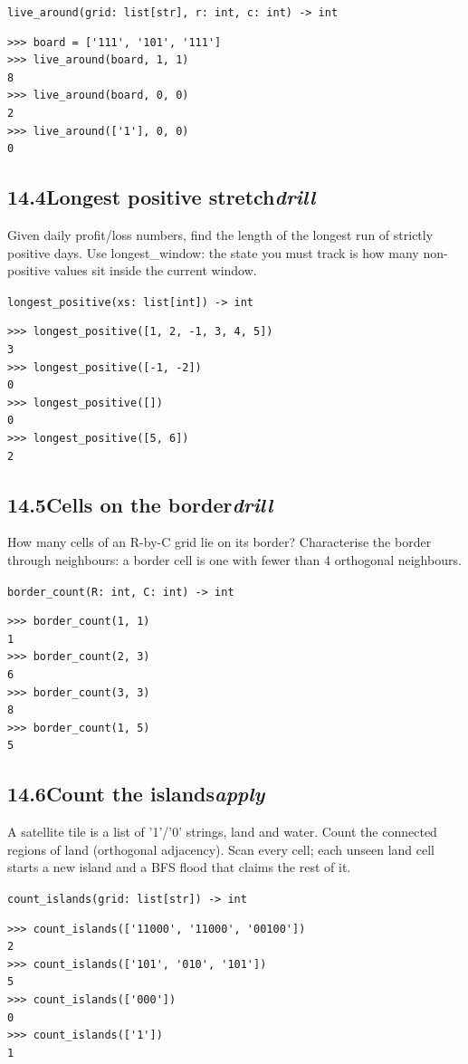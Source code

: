 \documentclass[10pt,letterpaper]{book}
\begin{document}
\noindent\texttt{live\_around(grid: list[str], r: int, c: int) -> int}
\begin{lstlisting}[style=ex]
>>> board = ['111', '101', '111']
>>> live_around(board, 1, 1)
8
>>> live_around(board, 0, 0)
2
>>> live_around(['1'], 0, 0)
0
\end{lstlisting}
\subsection*{14.4\quad Longest positive stretch\hfill\textnormal{\textit{drill}}}
Given daily profit/loss numbers, find the length of the longest run of strictly positive days. Use longest\_window: the state you must track is how many non-positive values sit inside the current window.

\noindent\texttt{longest\_positive(xs: list[int]) -> int}
\begin{lstlisting}[style=ex]
>>> longest_positive([1, 2, -1, 3, 4, 5])
3
>>> longest_positive([-1, -2])
0
>>> longest_positive([])
0
>>> longest_positive([5, 6])
2
\end{lstlisting}
\subsection*{14.5\quad Cells on the border\hfill\textnormal{\textit{drill}}}
How many cells of an R-by-C grid lie on its border? Characterise the border through neighbours: a border cell is one with fewer than 4 orthogonal neighbours.

\noindent\texttt{border\_count(R: int, C: int) -> int}
\begin{lstlisting}[style=ex]
>>> border_count(1, 1)
1
>>> border_count(2, 3)
6
>>> border_count(3, 3)
8
>>> border_count(1, 5)
5
\end{lstlisting}
\subsection*{14.6\quad Count the islands\hfill\textnormal{\textit{apply}}}
A satellite tile is a list of '1'/'0' strings, land and water. Count the connected regions of land (orthogonal adjacency). Scan every cell; each unseen land cell starts a new island and a BFS flood that claims the rest of it.

\noindent\texttt{count\_islands(grid: list[str]) -> int}
\begin{lstlisting}[style=ex]
>>> count_islands(['11000', '11000', '00100'])
2
>>> count_islands(['101', '010', '101'])
5
>>> count_islands(['000'])
0
>>> count_islands(['1'])
1
\end{lstlisting}
\end{document}
